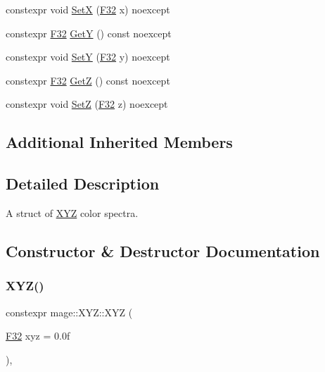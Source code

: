 \begin{DoxyCompactItemize}
\item 
constexpr void \mbox{\hyperlink{structmage_1_1_x_y_z_ad0f4356ba8d54cdd4b54482bfbe98374}{SetX}} (\mbox{\hyperlink{namespacemage_aa97e833b45f06d60a0a9c4fc22ae02c0}{F32}} x) noexcept
\item 
constexpr \mbox{\hyperlink{namespacemage_aa97e833b45f06d60a0a9c4fc22ae02c0}{F32}} \mbox{\hyperlink{structmage_1_1_x_y_z_a62c071fb7aa64b393fdb6088207df149}{GetY}} () const noexcept
\item 
constexpr void \mbox{\hyperlink{structmage_1_1_x_y_z_ad7caae74b92c23e12b70bef2d022805c}{SetY}} (\mbox{\hyperlink{namespacemage_aa97e833b45f06d60a0a9c4fc22ae02c0}{F32}} y) noexcept
\item 
constexpr \mbox{\hyperlink{namespacemage_aa97e833b45f06d60a0a9c4fc22ae02c0}{F32}} \mbox{\hyperlink{structmage_1_1_x_y_z_a2bb3aba163d325ebb844d26d240edcc9}{GetZ}} () const noexcept
\item 
constexpr void \mbox{\hyperlink{structmage_1_1_x_y_z_aa2321d3d9fbf155581827794c68781bd}{SetZ}} (\mbox{\hyperlink{namespacemage_aa97e833b45f06d60a0a9c4fc22ae02c0}{F32}} z) noexcept
\end{DoxyCompactItemize}
\subsection*{Additional Inherited Members}


\subsection{Detailed Description}
A struct of \mbox{\hyperlink{structmage_1_1_x_y_z}{X\+YZ}} color spectra. 

\subsection{Constructor \& Destructor Documentation}
\mbox{\label{structmage_1_1_x_y_z_af8b9ef53daa7463097c6397644a24ebf}} 
\subsubsection{\texorpdfstring{X\+Y\+Z()}{XYZ()}\hspace{0.1cm}{\footnotesize\ttfamily [1/6]}}
{\footnotesize\ttfamily constexpr mage\+::\+X\+Y\+Z\+::\+X\+YZ (\begin{DoxyParamCaption}\item[{\mbox{\hyperlink{namespacemage_aa97e833b45f06d60a0a9c4fc22ae02c0}{F32}}}]{xyz = {\ttfamily 0.0f} }\end{DoxyParamCaption})\hspace{0.3cm}{\ttfamily [explicit]}, {\ttfamily [noexcept]}}

